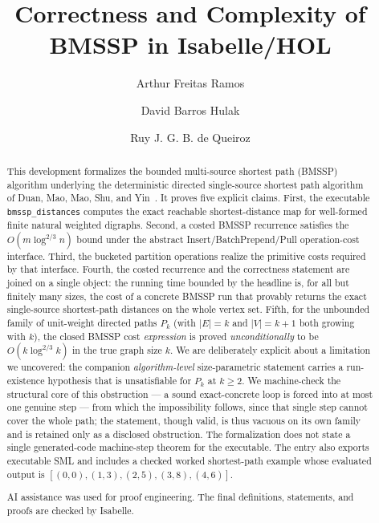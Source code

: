 \documentclass[11pt,a4paper]{article}
\begin{document}
\title{Correctness and Complexity of BMSSP in Isabelle/HOL}
\author{Arthur Freitas Ramos \and David Barros Hulak \and Ruy J. G. B. de Queiroz}
\maketitle

\begin{abstract}
This development formalizes the bounded multi-source shortest path (BMSSP)
algorithm underlying the deterministic directed single-source shortest path
algorithm of Duan, Mao, Mao, Shu, and Yin~\cite{DuanMaoMaoShuYin2025}.
It proves five explicit claims.  First, the executable
\texttt{bmssp\_distances} computes the exact reachable shortest-distance map
for well-formed finite natural weighted digraphs.  Second, a costed
BMSSP recurrence satisfies the \(O(m \log^{2/3} n)\) bound under the
abstract Insert/BatchPrepend/Pull operation-cost interface.  Third, the
bucketed partition operations realize the primitive costs required by that
interface.  Fourth, the costed recurrence and the correctness statement are
joined on a single object: the running time bounded by the headline is, for
all but finitely many sizes, the cost of a concrete BMSSP run that provably
returns the exact single-source shortest-path distances on the whole vertex
set.  Fifth, for the unbounded family of unit-weight directed paths \(P_k\)
(with \(\lvert E\rvert = k\) and \(\lvert V\rvert = k+1\) both growing with
\(k\)), the closed BMSSP cost \emph{expression} is proved
\emph{unconditionally} to be \(O(k \log^{2/3} k)\) in the true graph size
\(k\).  We are deliberately explicit about a limitation we uncovered: the
companion \emph{algorithm-level} size-parametric statement carries a
run-existence hypothesis that is unsatisfiable for \(P_k\) at \(k \ge 2\).  We
machine-check the structural core of this obstruction --- a sound exact-concrete
loop is forced into at most one genuine step --- from which the impossibility
follows, since that single step cannot cover the whole path; the statement,
though valid, is thus vacuous on its own family and is retained only as a
disclosed obstruction.  The
formalization does not state a single generated-code machine-step theorem for
the executable.  The entry also exports executable
SML and includes a checked worked shortest-path example whose evaluated
output is \([(0,0),(1,3),(2,5),(3,8),(4,6)]\).

AI assistance was used for proof engineering. The final definitions,
statements, and proofs are checked by Isabelle.
\end{abstract}
\end{document}
